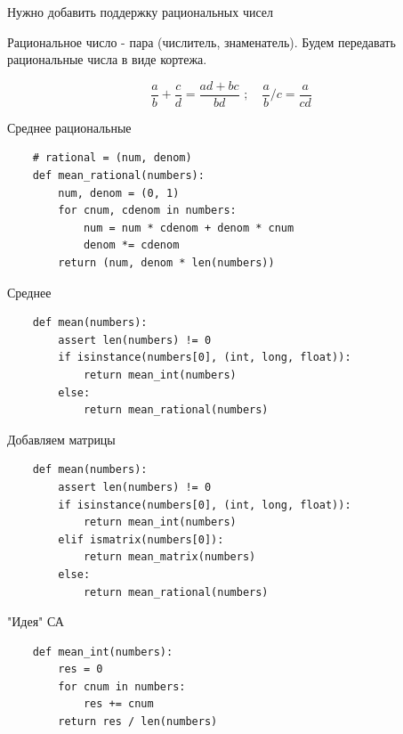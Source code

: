 \documentclass{article}
\begin{document}
\begin{center} Нужно добавить поддержку рациональных чисел \end{center}
Рациональное число - пара (числитель, знаменатель). Будем передавать
рациональные числа в виде кортежа.

$$
\frac{a}{b} + \frac{c}{d} = \frac{ad + bc}{bd}\,\,;
\quad
\frac{a}{b} / c = \frac{a}{cd}
$$
\newpage

\begin{center} Среднее рациональные \end{center}
\begin{lstlisting}
    # rational = (num, denom)
    def mean_rational(numbers):
        num, denom = (0, 1)
        for cnum, cdenom in numbers:
            num = num * cdenom + denom * cnum
            denom *= cdenom            
        return (num, denom * len(numbers))
\end{lstlisting}
\newpage

\begin{center} Среднее \end{center}
\begin{lstlisting}
    def mean(numbers):
        assert len(numbers) != 0
        if isinstance(numbers[0], (int, long, float)):
            return mean_int(numbers)
        else:
            return mean_rational(numbers)
\end{lstlisting}
\newpage

\begin{center} Добавляем матрицы \end{center}
\begin{lstlisting}
    def mean(numbers):
        assert len(numbers) != 0
        if isinstance(numbers[0], (int, long, float)):
            return mean_int(numbers)
        elif ismatrix(numbers[0]):
            return mean_matrix(numbers)
        else:
            return mean_rational(numbers)
\end{lstlisting}
\newpage

\begin{center} "Идея" СА \end{center}
\begin{lstlisting}
    def mean_int(numbers):
        res = 0
        for cnum in numbers:
            res += cnum
        return res / len(numbers)
\end{lstlisting}
\newpage
\end{document}
